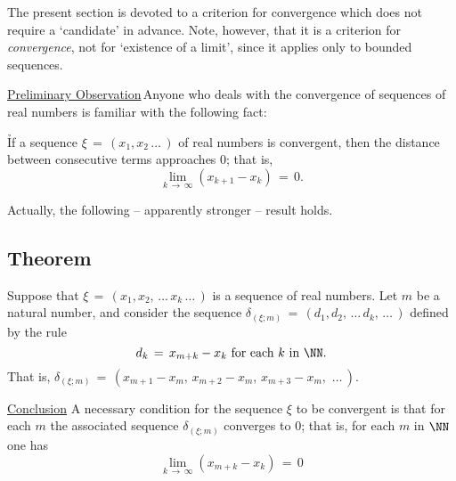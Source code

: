        The present section is devoted to a criterion for convergence which does not require a `candidate' in advance.
    Note, however, that it is a criterion for {\em convergence}, not for `existence of a limit', since it applies only to bounded sequences.

\V

        \underline{Preliminary Observation}\,Anyone who deals with the convergence of sequences of real numbers is familiar with the following fact:

\VA

        \h If a sequence ${\xi} \,=\, (x_{1}, x_{2}\,{\ldots}\,)$ of real numbers is convergent,
    then the distance between consecutive terms approaches $0$; that is, 
        \begin{equation}
        \label{EqnC.10}
        \lim_{k \,{\rightarrow}\, {\infty}} (x_{k+1}-x_{k}) \,=\, 0.
        \end{equation}

\VA

    Actually, the following -- apparently stronger -- result holds.

\V

            \subsection{\small{\bf Theorem}}
            \label{ThmC70.10}

\V

        Suppose that ${\xi} \,=\, (x_{1},x_{2},\,{\ldots}\,x_{k}\,{\ldots}\,)$ is a sequence of real numbers.
    Let $m$ be a natural number, and consider the sequence ${\delta}_{({\xi}; m)} \,=\, (d_{1},d_{2},\,{\ldots}\,d_{k},\,{\ldots}\,)$ defined by the rule
        \begin{displaymath}
        d_{k} \,=\, x_{m+k}-x_{k} \mbox{ for each $k$ in ${\NN}$}.
        \end{displaymath}
    That is, ${\delta}_{({\xi};m)} \,=\, (x_{m+1} - x_{m},\, x_{m+2} - x_{m},\, x_{m+3}-x_{m},\,\,{\ldots}\,)$.
    
        \underline{Conclusion}
    A necessary condition for the sequence ${\xi}$ to be convergent is that for each $m$ the associated sequence ${\delta}_{({\xi};m)}$ converges to $0$;
    that is, for each $m$ in ${\NN}$ one has
        \begin{equation}
        \label{CondC.20}
        \lim_{k \,{\rightarrow}\, {\infty}} (x_{m+k} - x_{k}) \,=\, 0
        \end{equation}

